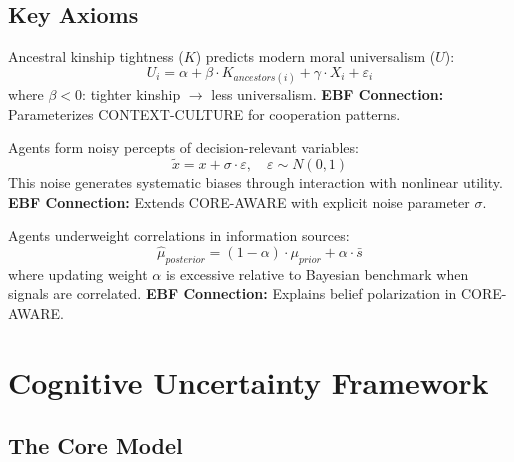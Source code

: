 \subsection{Key Axioms}

\begin{axiom}
\label{ax:be1}
Ancestral kinship tightness ($K$) predicts modern moral universalism ($U$):
\begin{equation}
U_i = \alpha + \beta \cdot K_{ancestors(i)} + \gamma \cdot X_i + \varepsilon_i
\end{equation}
where $\beta < 0$: tighter kinship $\rightarrow$ less universalism.
\textbf{EBF Connection:} Parameterizes CONTEXT-CULTURE for cooperation patterns.
\end{axiom}

\begin{axiom}
\label{ax:be2}
Agents form noisy percepts of decision-relevant variables:
\begin{equation}
\tilde{x} = x + \sigma \cdot \varepsilon, \quad \varepsilon \sim N(0, 1)
\end{equation}
This noise generates systematic biases through interaction with nonlinear utility.
\textbf{EBF Connection:} Extends CORE-AWARE with explicit noise parameter $\sigma$.
\end{axiom}

\begin{axiom}
\label{ax:be3}
Agents underweight correlations in information sources:
\begin{equation}
\hat{\mu}_{posterior} = (1-\alpha) \cdot \mu_{prior} + \alpha \cdot \bar{s}
\end{equation}
where updating weight $\alpha$ is excessive relative to Bayesian benchmark when signals are correlated.
\textbf{EBF Connection:} Explains belief polarization in CORE-AWARE.
\end{axiom}

\section{Cognitive Uncertainty Framework}

\subsection{The Core Model}

